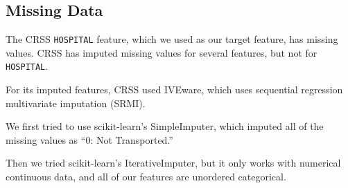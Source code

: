 \subsection{Missing Data}

The CRSS \verb|HOSPITAL| feature, which we used as our target feature, has missing values.  CRSS has imputed missing values for several features, but not for \verb|HOSPITAL|.  

For its imputed features, CRSS used IVEware, which uses sequential regression multivariate imputation (SRMI).  

We first tried to use scikit-learn's SimpleImputer, which imputed all of the missing values as ``0: Not Transported.''

Then we tried scikit-learn's IterativeImputer, but it only works with numerical continuous data, and all of our features are unordered categorical.

